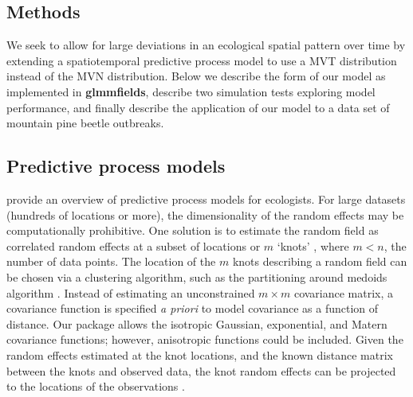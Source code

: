 \documentclass[12pt,english]{article}
\begin{document}
\begin{spacing}{1.9}
\section{Methods}

We seek to allow for large deviations in an ecological spatial pattern over
time by extending a spatiotemporal predictive process model to use a MVT
distribution instead of the MVN distribution. Below we describe the form of
our model as implemented in \textbf{glmmfields}, describe two simulation tests
exploring model performance, and finally describe the application of our model
to a data set of mountain pine beetle outbreaks.

\subsection{Predictive process models}

\citet{latimer2009} provide an overview of predictive process models for
ecologists. For large datasets (hundreds of locations or more), the
dimensionality of the random effects may be computationally prohibitive. One
solution is to estimate the random field as correlated random effects at a
subset of locations or $m$ `knots' \citep[e.g.][]{latimer2009, shelton2014},
where $m < n$, the number of data points. The location of the $m$ knots
describing a random field can be chosen via a clustering algorithm, such as the
partitioning around medoids algorithm \citep[e.g.\ the \texttt{pam} function in
the R package \textbf{cluster};][]{reynolds2006}. Instead of estimating an
unconstrained $m \times m$ covariance matrix, a covariance function is specified
\emph{a priori} to model covariance as a function of distance. Our package
allows the isotropic Gaussian, exponential, and Matern covariance functions;
however, anisotropic functions could be included. Given the random effects
estimated at the knot locations, and the known distance matrix between the knots
and observed data, the knot random effects can be projected to the locations of
the observations \citep[][Figure~\ref{fig:didactic}]{latimer2009, finley2009}.


\end{spacing}
\end{document}
